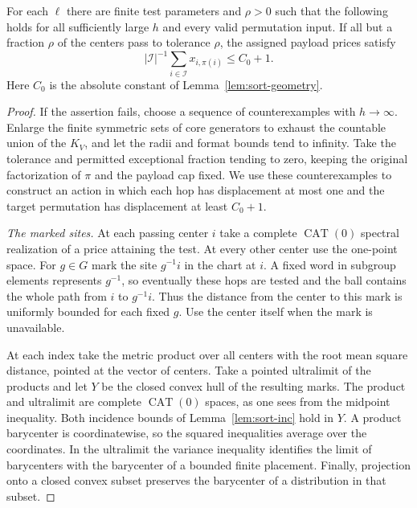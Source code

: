 \begin{lemma}\label{lem:sort-local-tests}
For each $\ell$ there are finite test parameters and $\rho>0$ such
that the following holds for all sufficiently large $h$ and every
valid permutation input. If all but a fraction $\rho$ of the centers
pass to tolerance $\rho$, the assigned payload prices satisfy
\[
        |\mathcal I|^{-1}\sum_{i\in\mathcal I} x_{i,\pi(i)}
                  \le C_0+1 .
\]
Here $C_0$ is the absolute constant of Lemma~\ref{lem:sort-geometry}.
\end{lemma}

\begin{proof}
If the assertion fails, choose a sequence of counterexamples with
$h\to\infty$. Enlarge the finite symmetric sets of core generators
to exhaust the countable union of the $K_V$, and let the radii and format
bounds tend to infinity. Take the tolerance and permitted exceptional
fraction tending to zero, keeping the original factorization of $\pi$
and the payload cap fixed. We use these counterexamples to construct
an action in which each hop has displacement at most one and the
target permutation has displacement at least $C_0+1$.

\smallskip\noindent
\emph{The marked sites.}
At each passing center $i$ take a complete $\operatorname{CAT}(0)$
spectral realization of a price attaining the test. At every other
center use the one-point space. For $g\in G$ mark the site $g^{-1}i$
in the chart at $i$. A fixed word in subgroup elements represents
$g^{-1}$, so eventually these hops are tested and the ball contains
the whole path from $i$ to $g^{-1}i$. Thus the distance from the
center to this mark is uniformly bounded for each fixed $g$.
Use the center itself when the mark is unavailable.

At each index take the metric product over all centers with the
root mean square distance, pointed at the vector of centers.
Take a pointed ultralimit of the products and let $Y$ be the closed
convex hull of the resulting marks. The product and ultralimit are
complete $\operatorname{CAT}(0)$ spaces, as one sees from the
midpoint inequality. Both incidence bounds of Lemma~\ref{lem:sort-inc}
hold in $Y$. A product barycenter is coordinatewise, so the squared
inequalities average over the coordinates. In the ultralimit the
variance inequality identifies the limit of barycenters with the
barycenter of a bounded finite placement. Finally, projection onto a
closed convex subset preserves the barycenter of a distribution in
that subset.


\end{proof}
